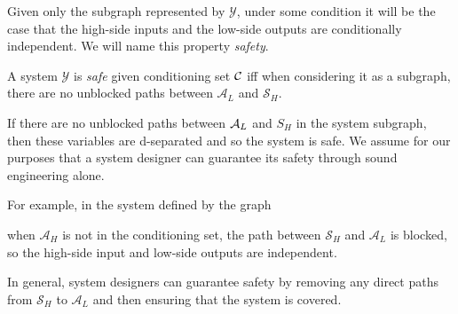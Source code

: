 \documentclass[../thesis.tex]{subfiles}
\begin{document}
Given only the subgraph represented by $\mathcal{Y}$,
under some condition it will be the case that the
high-side inputs and the low-side outputs are conditionally
independent.
We will name this property \emph{safety}.

\begin{dfn}[Safe]
  A system $\mathcal{Y}$ is \emph{safe} given
  conditioning set $\mathcal{C}$ iff
  when considering it as a subgraph,
  there are no unblocked paths between 
  $\mathcal{A}_L$ and $\mathcal{S}_H$.
\end{dfn}

If there are no unblocked paths between $\mathcal{A}_L$ and ${S}_H$
in the system subgraph, then these variables are d-separated
and so the system is safe.
We assume for our purposes that a system designer can
guarantee its safety through sound engineering alone.

For example, in the system defined by the graph
\begin{center}
\end{center}

when $\mathcal{A}_H$ is not in the conditioning set,
the path between $\mathcal{S}_H$ and $\mathcal{A}_L$
is blocked, so the high-side input and low-side
outputs are independent.

In general, system designers can guarantee safety
by removing any direct paths from $\mathcal{S}_H$ to
$\mathcal{A}_L$ and then ensuring that the system is
covered.
\end{document}
